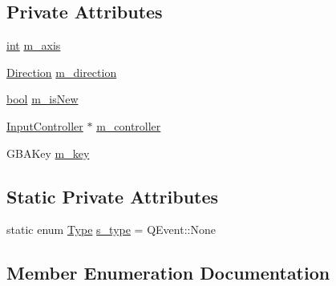 \subsection*{Private Attributes}
\begin{DoxyCompactItemize}
\item 
\mbox{\hyperlink{ioapi_8h_a787fa3cf048117ba7123753c1e74fcd6}{int}} \mbox{\hyperlink{class_q_g_b_a_1_1_gamepad_axis_event_a8cccf59baf2fb3b602be8cc7869d4ff2}{m\+\_\+axis}}
\item 
\mbox{\hyperlink{class_q_g_b_a_1_1_gamepad_axis_event_a5d50ab74dce4e58252f2affb5f227bbc}{Direction}} \mbox{\hyperlink{class_q_g_b_a_1_1_gamepad_axis_event_a099de49e02cd6f6191a34bb8441c82c0}{m\+\_\+direction}}
\item 
\mbox{\hyperlink{libretro_8h_a4a26dcae73fb7e1528214a068aca317e}{bool}} \mbox{\hyperlink{class_q_g_b_a_1_1_gamepad_axis_event_ab40e75c6b9d2e456d91c132a018fecb3}{m\+\_\+is\+New}}
\item 
\mbox{\hyperlink{class_q_g_b_a_1_1_input_controller}{Input\+Controller}} $\ast$ \mbox{\hyperlink{class_q_g_b_a_1_1_gamepad_axis_event_a93c997da6d42f8f11c528a59f63a2872}{m\+\_\+controller}}
\item 
G\+B\+A\+Key \mbox{\hyperlink{class_q_g_b_a_1_1_gamepad_axis_event_ac020f9da47dc5629f5540ceda328aa10}{m\+\_\+key}}
\end{DoxyCompactItemize}
\subsection*{Static Private Attributes}
\begin{DoxyCompactItemize}
\item 
static enum \mbox{\hyperlink{class_q_g_b_a_1_1_gamepad_axis_event_acd745058d3f98c37837432bf01067c16}{Type}} \mbox{\hyperlink{class_q_g_b_a_1_1_gamepad_axis_event_afed184c4e5a00b2b09fa01d0e8713b28}{s\+\_\+type}} = Q\+Event\+::\+None
\end{DoxyCompactItemize}


\subsection{Member Enumeration Documentation}
\mbox{\label{class_q_g_b_a_1_1_gamepad_axis_event_a5d50ab74dce4e58252f2affb5f227bbc}} 
